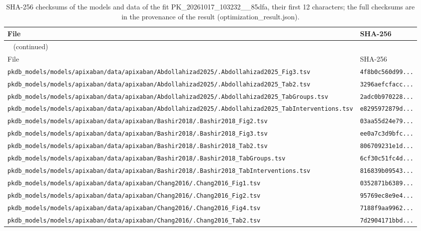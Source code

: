 \documentclass{article}
\begin{document}
\begin{longtable}{ll}
\caption{SHA-256 checksums of the models and data of the fit PK\_20261017\_103232\_\_85dfa, their first 12 characters; the full checksums are in the provenance of the result (optimization\_result.json).}\label{tab:checksums:PK_20261017_103232__85dfa} \\
\toprule
File & SHA-256 \\
\midrule
\endfirsthead
\multicolumn{2}{l}{\small\tablename~\thetable{} (continued)} \\
\toprule
File & SHA-256 \\
\midrule
\endhead
\bottomrule
\endlastfoot
\texttt{pkdb\_models/models/apixaban/data/apixaban/Abdollahizad2025/.Abdollahizad2025\_Fig3.tsv} & \texttt{4f8b0c560d99...} \\
\texttt{pkdb\_models/models/apixaban/data/apixaban/Abdollahizad2025/.Abdollahizad2025\_Tab2.tsv} & \texttt{3296aefcfacc...} \\
\texttt{pkdb\_models/models/apixaban/data/apixaban/Abdollahizad2025/.Abdollahizad2025\_TabGroups.tsv} & \texttt{2adc0b970228...} \\
\texttt{pkdb\_models/models/apixaban/data/apixaban/Abdollahizad2025/.Abdollahizad2025\_TabInterventions.tsv} & \texttt{e8295972879d...} \\
\texttt{pkdb\_models/models/apixaban/data/apixaban/Bashir2018/.Bashir2018\_Fig2.tsv} & \texttt{03aa55d24e79...} \\
\texttt{pkdb\_models/models/apixaban/data/apixaban/Bashir2018/.Bashir2018\_Fig3.tsv} & \texttt{ee0a7c3d9bfc...} \\
\texttt{pkdb\_models/models/apixaban/data/apixaban/Bashir2018/.Bashir2018\_Tab2.tsv} & \texttt{806709231e1d...} \\
\texttt{pkdb\_models/models/apixaban/data/apixaban/Bashir2018/.Bashir2018\_TabGroups.tsv} & \texttt{6cf30c51fc4d...} \\
\texttt{pkdb\_models/models/apixaban/data/apixaban/Bashir2018/.Bashir2018\_TabInterventions.tsv} & \texttt{816839b09543...} \\
\texttt{pkdb\_models/models/apixaban/data/apixaban/Chang2016/.Chang2016\_Fig1.tsv} & \texttt{0352871b6389...} \\
\texttt{pkdb\_models/models/apixaban/data/apixaban/Chang2016/.Chang2016\_Fig2.tsv} & \texttt{95769ec8e9e4...} \\
\texttt{pkdb\_models/models/apixaban/data/apixaban/Chang2016/.Chang2016\_Fig4.tsv} & \texttt{7188f9aa9962...} \\
\texttt{pkdb\_models/models/apixaban/data/apixaban/Chang2016/.Chang2016\_Tab2.tsv} & \texttt{7d2904171bbd...} \\

\end{longtable}
\end{document}
